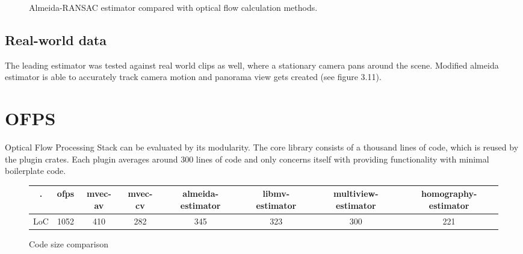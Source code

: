 \documentclass[11pt,english]{report}
\newcommand{\getstat}[1]{docs/statistics/#1}
\newcommand{\vidpic}[1]{
	\texttt{[image: docs/report/\#1]}
}
\newcommand{\statplot}[4]{
	\addplot[#3, mark = #4, thick, smooth, mark size = 2, mark options={fill=#3}] table [y=#2, col sep=comma] {\getstat{#1}};
}
\begin{document}
\begin{figure}[!ht]
\begin{center}
\end{center}
\caption{\centering Almeida-RANSAC estimator compared with optical flow calculation methods.}
\end{figure}

\subsection{Real-world data}

The leading estimator was tested against real world clips as well, where a stationary camera pans around the scene. Modified almeida estimator is able to accurately track camera motion and panorama view gets created (see figure 3.11).

\newpage

\section{OFPS}

Optical Flow Processing Stack can be evaluated by its modularity. The core library consists of a thousand lines of code, which is reused by the plugin crates. Each plugin averages around 300 lines of code and only concerns itself with providing functionality with minimal boilerplate code.

\begin{figure}[!ht]
	\begin{center}
		\begin{tabular}{| c | c | c | c | c | c | c | c |} 
			\hline
			. & ofps & mvec-av & mvec-cv & almeida-estimator & libmv-estimator & multiview-estimator & homography-estimator \\ [0.5ex] 
			\hline
			LoC & 1052 & 410 & 282 & 345 & 323 & 300 & 221 \\ 
			\hline
		\end{tabular}
\end{center}
	\caption{\centering Code size comparison}
\end{figure}
\end{document}
